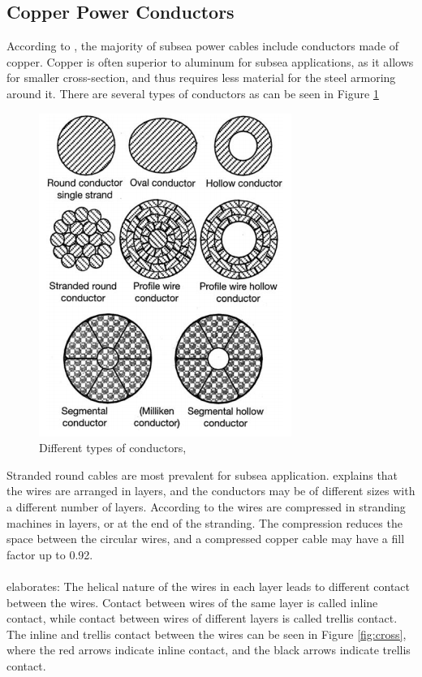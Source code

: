 \subsection{Copper Power Conductors}
  According to \cite{Worzyk}, the majority of subsea power cables include conductors made of copper. Copper is often superior to aluminum for subsea applications, as it allows for smaller cross-section, and thus requires less material for the steel armoring around it. There are several  types of conductors as can be seen in Figure \ref{fig:conductors}
  \begin{figure}[H]
\centering
\includegraphics[scale=0.6]{figures/conductors}
\caption[$\; \:$Different types of conductors]{Different types of conductors, \cite{Worzyk} }
 \label{fig:conductors}
\end{figure}
 Stranded round cables are most prevalent for subsea application. \cite{Nasution2013} explains that the wires are arranged in layers, and the conductors may be of different sizes with a different number of layers. According to \cite{Worzyk} the wires are compressed in stranding machines in layers, or at the end of the stranding. The compression reduces the space between the circular wires, and a compressed copper cable may have a fill factor up to 0.92. 
  \\\\
 \cite{Nasution2013} elaborates: The helical nature of the wires in each layer leads to different contact between the wires. Contact between wires of the same layer is called inline contact, while contact between wires of different layers is called trellis contact. The inline and trellis contact between the wires can be seen in Figure \ref{fig:cross}, where the red arrows indicate inline contact, and the black arrows indicate trellis contact. 
